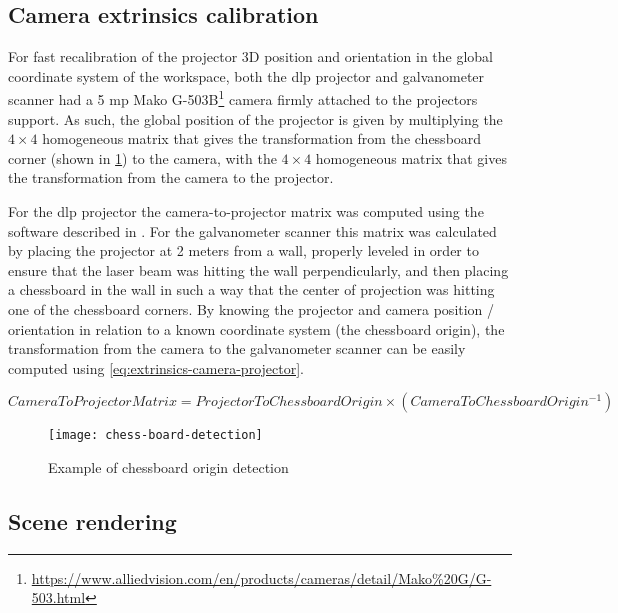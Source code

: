 \subsection{Camera extrinsics calibration}

For fast recalibration of the projector 3D position and orientation in the global coordinate system of the workspace, both the \gls{dlp} projector and galvanometer scanner had a 5 \gls{mp} Mako G-503B\footnote{\url{https://www.alliedvision.com/en/products/cameras/detail/Mako\%20G/G-503.html}} camera firmly attached to the projectors support. As such, the global position of the projector is given by multiplying the $4 \times 4$ homogeneous matrix that gives the transformation from the chessboard corner (shown in \cref{fig:chess-board-detection}) to the camera, with the $4 \times 4$ homogeneous matrix that gives the transformation from the camera to the projector.

For the \gls{dlp} projector the camera-to-projector matrix was computed using the software described in \cite{Moreno2012}. For the galvanometer scanner this matrix was calculated by placing the projector at 2 meters from a wall, properly leveled in order to ensure that the laser beam was hitting the wall perpendicularly, and then placing a chessboard in the wall in such a way that the center of projection was hitting one of the chessboard corners. By knowing the projector and camera position / orientation in relation to a known coordinate system (the chessboard origin), the transformation from the camera to the galvanometer scanner can be easily computed using \cref{eq:extrinsics-camera-projector}.

\begin{small}
	\begin{equation}\label{eq:extrinsics-camera-projector}
	CameraToProjectorMatrix = ProjectorToChessboardOrigin \times (CameraToChessboardOrigin^{-1})
	\end{equation}
\end{small}

\begin{figure}[H]
	\centering
	\texttt{[image: chess-board-detection]}
	\caption{Example of chessboard origin detection}
	\label{fig:chess-board-detection}
\end{figure}


\subsection{Scene rendering}


